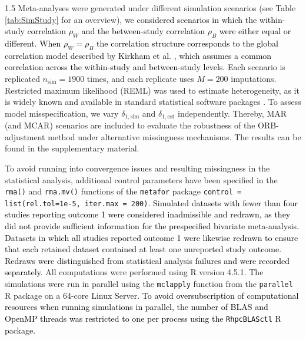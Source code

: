 \documentclass{article}
\newcommand{\mycolor}[1]{\textcolor{black}{#1}}
\begin{document}
\begin{spacing}{1.5}
Meta-analyses were generated under different simulation scenarios (see Table \ref{tab:SimStudy} for an overview), \eg \mycolor{we considered scenarios in which the within-study correlation $\rho_W$ and the between-study correlation $\rho_B$ were either equal or different. When $\rho_W = \rho_B$ the correlation structure corresponds to the global correlation model described by Kirkham et al. \cite{kirkham2012multivariate}, which assumes a common correlation across the within-study and between-study levels.}
Each scenario is replicated $n_{\text{sim}}=1900$ times, and each replicate uses $M=200$ imputations. 
Restricted maximum likelihood (REML) was used to estimate heterogeneity, as it is widely known and available in standard statistical software packages \cite{langan2019comparison, jackson2011multivariate, schmid2020handbook}. To assess model misspecification, we vary $\delta_{1,\text{sim}}$ and $\delta_{1,\text{est}}$ independently. Thereby, MAR (and MCAR) scenarios are included to evaluate the robustness of the ORB-adjustment method under alternative missingness mechanisms. The results can be found in the supplementary material.

To avoid running into convergence issues and resulting missingness in the statistical analysis, additional control parameters have been specified in the \texttt{rma()} and \texttt{rma.mv()} functions of the \texttt{metafor} package \ie \texttt{control = list(rel.tol=1e-5, iter.max = 200)}. \mycolor{Simulated datasets with fewer than four studies reporting outcome 1 were considered inadmissible and redrawn, as they did not provide sufficient information for the prespecified bivariate meta-analysis. Datasets in which all studies reported outcome 1 were likewise redrawn to ensure that each retained dataset contained at least one unreported study outcome. Redraws were distinguished from statistical analysis failures and were recorded separately}.
All computations were performed using R version 4.5.1. The simulations were run in parallel using the \texttt{mclapply} function from the \texttt{parallel} R package on a 64-core Linux Server. \mycolor{To avoid oversubscription of computational resources when running simulations in parallel, the number of BLAS and OpenMP threads was restricted to one per process using the \texttt{RhpcBLASctl} R package.}


\end{spacing}
\end{document}
